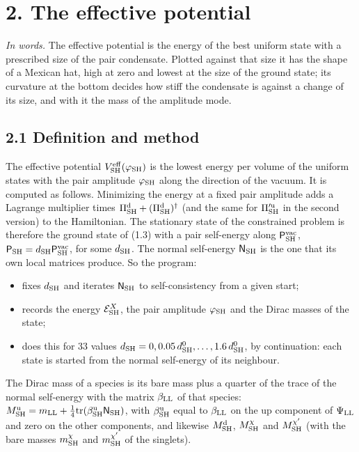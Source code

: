 \documentclass[
  10pt,
]{article}
\providecommand{\tightlist}{%
  \setlength{\itemsep}{0pt}\setlength{\parskip}{0pt}}
\begin{document}
\hypertarget{the-effective-potential}{%
\section{2. The effective potential}\label{the-effective-potential}}

\emph{In words.} The effective potential is the energy of the best
uniform state with a prescribed size of the pair condensate. Plotted
against that size it has the shape of a Mexican hat, high at zero and
lowest at the size of the ground state; its curvature at the bottom
decides how stiff the condensate is against a change of its size, and
with it the mass of the amplitude mode.

\hypertarget{definition-and-method}{%
\subsection{2.1 Definition and method}\label{definition-and-method}}

The effective potential \(V^{\rm eff}_{\rm SH}(\varphi_{\rm SH})\) is
the lowest energy per volume of the uniform states with the pair
amplitude \(\varphi_{\rm SH}\) along the direction of the vacuum. It is
computed as follows. Minimizing the energy at a fixed pair amplitude
adds a Lagrange multiplier times
\(\Pi^{\rm d}_{\rm SH}+(\Pi^{\rm d}_{\rm SH})^\dagger\) (and the same
for \(\Pi'^{\rm u}_{\rm SH}\) in the second version) to the Hamiltonian.
The stationary state of the constrained problem is therefore the ground
state of (1.3) with a pair self-energy along
\(\mathsf P^{\rm vac}_{\rm SH}\),
\(\mathsf P_{\rm SH}=d_{\rm SH}\mathsf P^{\rm vac}_{\rm SH}\), for some
\(d_{\rm SH}\). The normal self-energy \(\mathsf N_{\rm SH}\) is the one
that its own local matrices produce. So the program:

\begin{itemize}
\tightlist
\item
  fixes \(d_{\rm SH}\) and iterates \(\mathsf N_{\rm SH}\) to
  self-consistency from a given start;
\item
  records the energy \(\mathcal E^X_{\rm SH}\), the pair amplitude
  \(\varphi_{\rm SH}\) and the Dirac masses of the state;
\item
  does this for 33 values
  \(d_{\rm SH}=0,0.05\,d^0_{\rm SH},\dots,1.6\,d^0_{\rm SH}\), by
  continuation: each state is started from the normal self-energy of its
  neighbour.
\end{itemize}

The Dirac mass of a species is its bare mass plus a quarter of the trace
of the normal self-energy with the matrix \(\beta_{\rm LL}\) of that
species:
\(M^{\rm u}_{\rm SH}=m_{\rm LL}+\tfrac14\mathrm{tr}(\beta^{\rm u}_{\rm SH}\mathsf N_{\rm SH})\),
with \(\beta^{\rm u}_{\rm SH}\) equal to \(\beta_{\rm LL}\) on the up
component of \(\Psi_{\rm LL}\) and zero on the other components, and
likewise \(M^{\rm d}_{\rm SH}\), \(M^\chi_{\rm SH}\) and
\(M^{\chi'}_{\rm SH}\) (with the bare masses \(m^\chi_{\rm SH}\) and
\(m^{\chi'}_{\rm SH}\) of the singlets).
\end{document}
